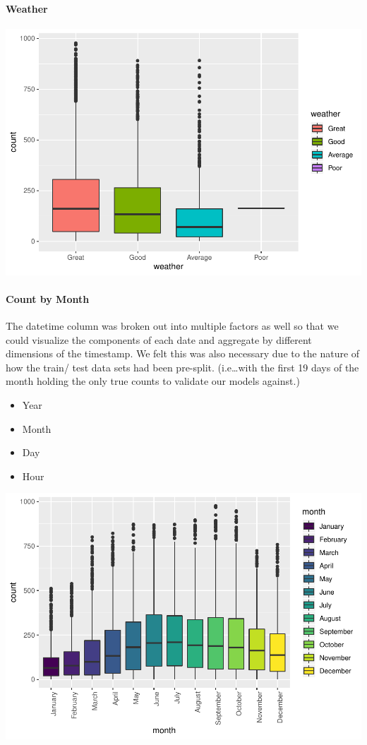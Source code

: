 \documentclass[american,]{article}
\providecommand{\tightlist}{%
  \setlength{\itemsep}{0pt}\setlength{\parskip}{0pt}}
\let\oldparagraph\paragraph
\renewcommand{\paragraph}[1]{\oldparagraph{#1}\mbox{}}
\begin{document}
\hypertarget{weather}{%
\paragraph{Weather}\label{weather}}

\includegraphics{BikeSharingDemand_files/figure-latex/train.mod.1.weather-1.pdf}

\hypertarget{count-by-month}{%
\paragraph{Count by Month}\label{count-by-month}}

The datetime column was broken out into multiple factors as well so that we could visualize the components of each date and aggregate by different dimensions of the timestamp. We felt this was also necessary due to the nature of how the train/ test data sets had been pre-split. (i.e\ldots{}with the first 19 days of the month holding the only true counts to validate our models against.)

\begin{itemize}
\tightlist
\item
  Year
\item
  Month
\item
  Day
\item
  Hour
\end{itemize}

\includegraphics{BikeSharingDemand_files/figure-latex/train.mod.1.month-1.pdf}
\end{document}
